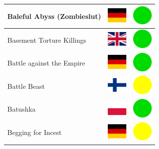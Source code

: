 \documentclass[12pt, a4paper, twoside]{report}
\begin{document}
\begin{center}
\begin{longtable}{|p{5cm}|p{2cm}|p{2cm}|}
Baleful Abyss (Zombieslut) & \includegraphics[width=1cm]{4x3/de} & \includegraphics[width=1cm]{likes/y} \\ \hline
Basement Torture Killings & \includegraphics[width=1cm]{4x3/gb} & \includegraphics[width=1cm]{likes/y} \\ \hline
Battle against the Empire & \includegraphics[width=1cm]{4x3/de} & \includegraphics[width=1cm]{likes/y} \\ \hline
Battle Beast & \includegraphics[width=1cm]{4x3/fi} & \includegraphics[width=1cm]{likes/m} \\ \hline
Batushka & \includegraphics[width=1cm]{4x3/pl} & \includegraphics[width=1cm]{likes/y} \\ \hline
Begging for Incest & \includegraphics[width=1cm]{4x3/de} & \includegraphics[width=1cm]{likes/m} \\ \hline

\end{longtable}
\end{center}
\end{document}
